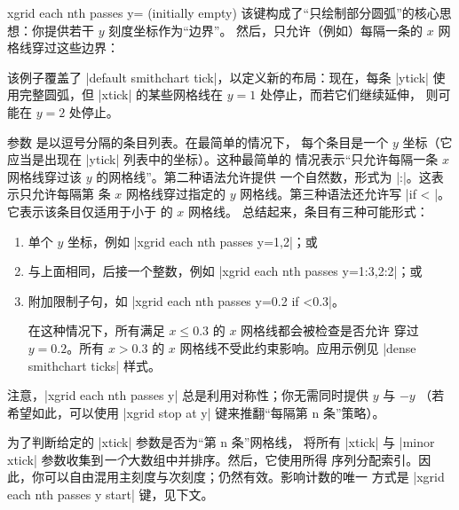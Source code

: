 \begin{pgfplotskey}{xgrid each nth passes y= (initially empty)}
    该键构成了“只绘制部分圆弧”的核心思想：你提供若干 $y$ 刻度坐标作为“边界”。
    然后，只允许（例如）每隔一条的 $x$ 网格线穿过这些边界：
\begin{codeexample}[]
\begin{tikzpicture}
\begin{smithchart}[
    xtick={0.2,0.5,1,2,5},
    ytick={
        0,
         0.2, 0.5, 1, 2, 5,
        -0.2,-0.5,-1,-2,-5
    },
    xgrid each nth passes y={1,2},
]
\end{smithchart}
\end{tikzpicture}
\end{codeexample}
    该例子覆盖了 |default smithchart tick|，以定义新的布局：现在，每条 |ytick|
    使用完整圆弧，但 |xtick| 的某些网格线在 $y=1$ 处停止，而若它们继续延伸，
    则可能在 $y=2$ 处停止。

    参数  是以逗号分隔的条目列表。在最简单的情况下，
    每个条目是一个 $y$ 坐标（它应当是出现在 |ytick| 列表中的坐标）。这种最简单的
    情况表示“只允许每隔一条 $x$ 网格线穿过该 $y$ 的网格线”。第二种语法允许提供
    一个自然数，形式为 |:|。这表示只允许每隔第
     条 $x$ 网格线穿过指定的 $y$ 网格线。第三种语法还允许写
    |if < |。它表示该条目仅适用于小于  的 $x$ 网格线。
    总结起来，条目有三种可能形式：
    \begin{enumerate}
        \item 单个 $y$ 坐标，例如 |xgrid each nth passes y={1,2}|；或
        \item 与上面相同，后接一个整数，例如
            |xgrid each nth passes y={1:3,2:2}|；或
        \item 附加限制子句，如 |xgrid each nth passes y={0.2 if <0.3}|。

            在这种情况下，所有满足 $x \le 0.3$ 的 $x$ 网格线都会被检查是否允许
            穿过 $y=0.2$。所有 $x > 0.3$ 的 $x$ 网格线不受此约束影响。应用示例见
            |dense smithchart ticks| 样式。
    \end{enumerate}

    注意，|xgrid each nth passes y| 总是利用对称性；你无需同时提供 $y$ 与 $-y$
    （若希望如此，可以使用 |xgrid stop at y| 键来推翻“每隔第 n 条”策略）。

    为了判断给定的 |xtick| 参数是否为“第 n 条”网格线，\PGFPlots{} 将所有
    |xtick| 与 |minor xtick| 参数收集到\emph{一个}大数组中并排序。然后，它使用所得
    序列分配索引。因此，你可以自由混用主刻度与次刻度；仍然有效。影响计数的唯一
    方式是 |xgrid each nth passes y start| 键，见下文。
\end{pgfplotskey}

